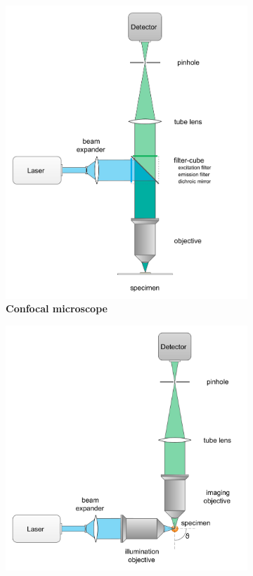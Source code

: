 \documentclass{diploma_style}
\begin{document}
\begin{figure}
\begin{subfigure}[t]{0.49\textwidth}
	\centering
	\includegraphics[width=\textwidth]{figures/1_introduction/confocal}
	\caption{\textbf{Confocal microscope}}
	\label{fig:confocal}
\end{subfigure}
\begin{subfigure}[t]{0.49\textwidth}
	\centering
	\includegraphics[width=\textwidth]{figures/1_introduction/conf-theta}

\end{subfigure}
\end{figure}
\end{document}
